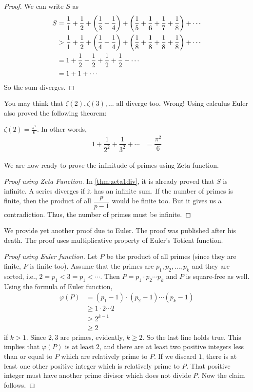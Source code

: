 \documentclass{subfiles}
\begin{document}
		\begin{proof}
			We can write $S$ as
				\begin{align*}
					S & =\dfrac11+ \dfrac12+ \func{}{\dfrac13+\dfrac14}+ \func{}{\dfrac15+\dfrac16+\dfrac17+\dfrac18}+\cdots\\
					  & > \dfrac11+\dfrac12+ \func{}{\dfrac14+\dfrac14} + \func{}{\dfrac18+\dfrac18+\dfrac18+\dfrac18}+\cdots\\
					  & =1+ \dfrac{1}{2}+ \dfrac{1}{2}+ \dfrac{1}{2}+ \dfrac{1}{2}+\cdots\\
					  & = 1+1+\cdots
				\end{align*}
			So the sum diverges.
		\end{proof}
	You may think that $\zeta(2),\zeta(3),\ldots$ all diverge too. Wrong! Using calculus Euler also proved the following theorem:
		\begin{theorem}[Euler]\label{thm:zeta2}
			$\zeta(2)=\frac{\pi^2}{6}$. In other words,
				\begin{align*}
					1+\dfrac{1}{2^2}+\dfrac{1}{3^2}+\cdots & = \dfrac{\pi^2}{6}
				\end{align*}
		\end{theorem}
	We are now ready to prove the infinitude of primes using Zeta function.
		\begin{proof}[Proof using Zeta Function]
			In \autoref{thm:zeta1div}, it is already proved that $S$ is infinite. A series diverges if it has an infinite sum. If the number of primes is finite, then the product of all $\dfrac p{p-1}$ would be finite too. But it gives us a contradiction. Thus, the number of primes must be infinite.
		\end{proof}
	We provide yet another proof due to Euler. The proof was published after his death. The proof uses multiplicative property of Euler's Totient function.
		\begin{proof}[Proof using Euler function]
			Let $P$ be the product of all primes (since they are finite, $P$ is finite too). Assume that the primes are $p_1,p_2,\ldots, p_k$ and they are sorted, i.e., $2=p_1<3=p_1<\cdots$. Then $P = p_1\cdot p_2\cdots p_k$ and $P$ is square-free as well. Using the formula of Euler function,
				\begin{align*}
					\varphi(P)  & = (p_1-1)\cdot(p_2-1)\cdots(p_k-1)\\
							& \geq 1\cdot2\cdots2\\
							& \geq 2^{k-1}\\
							& \geq 2
				\end{align*}
			if $k>1$. Since $2,3$ are primes, evidently, $k\geq2$. So the last line holds true. This implies that $\varphi(P)$ is at least $2$, and there are at least two positive integers less than or equal to $P$ which are relatively prime to $P$. If we discard $1$, there is at least one other positive integer which is relatively prime to $P$. That positive integer must have another prime divisor which does not divide $P$. Now the claim follows.
		\end{proof}
\end{document}
